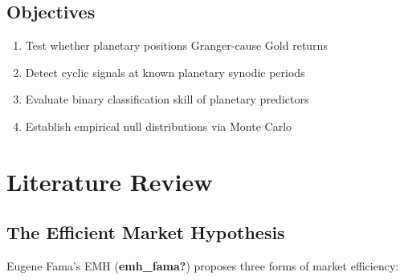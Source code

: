 \documentclass[
  11pt,
  a4paper,
  oneside,
  openany]{article}
\providecommand{\tightlist}{%
  \setlength{\itemsep}{0pt}\setlength{\parskip}{0pt}}\usepackage{longtable,booktabs,array}
\begin{document}
\subsection{Objectives}\label{objectives}

\begin{enumerate}
\def\labelenumi{\arabic{enumi}.}
\tightlist
\item
  Test whether planetary positions Granger-cause Gold returns
\item
  Detect cyclic signals at known planetary synodic periods
\item
  Evaluate binary classification skill of planetary predictors
\item
  Establish empirical null distributions via Monte Carlo
\end{enumerate}

\section{Literature Review}\label{literature-review}

\subsection{The Efficient Market
Hypothesis}\label{the-efficient-market-hypothesis}

Eugene Fama's EMH (\textbf{emh\_fama?}) proposes three forms of market
efficiency:
\end{document}
